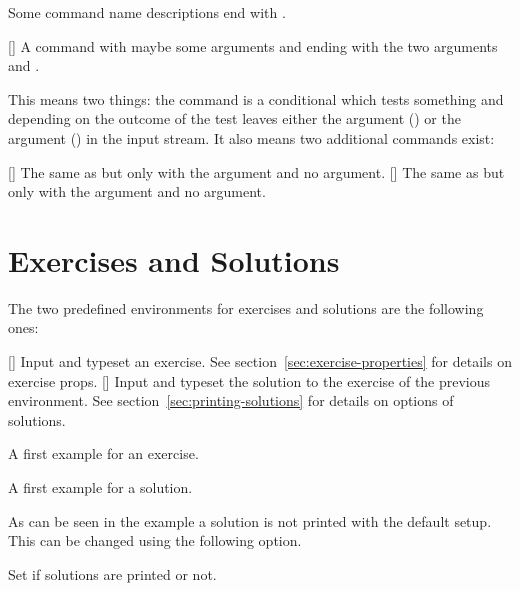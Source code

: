 \documentclass{xsim-manual}
\begin{document}
Some command name descriptions end with \code{\TF}.
\begin{commands}
  []
    A command with maybe some arguments and ending with the two arguments
     and .
\end{commands}
This means two things: the command is a conditional which tests something and
depending on the outcome of the test leaves either the  argument
() or the  argument () in the input stream.  It
also means two additional commands exist:
\begin{commands}
  []
    The same as  but only with the  argument and
    no  argument.
  []
    The same as  but only with the  argument and
    no  argument.
\end{commands}

\section{Exercises and Solutions}

The two predefined environments for exercises and solutions are the following
ones:
\begin{environments}
  []
    Input and typeset an exercise.  See section~\vref{sec:exercise-properties}
    for details on exercise \acsp*{prop}.
  []
    Input and typeset the solution to the exercise of the previous
     environment.  See section~\vref{sec:printing-solutions} for
    details on options of solutions.
\end{environments}

\begin{example}
  \begin{exercise}
    A first example for an exercise.
  \end{exercise}
  \begin{solution}
    A first example for a solution.
  \end{solution}
\end{example}

As can be seen in the example a solution is not printed with the default
setup.  This can be changed using the following option.
\begin{options}
    Set if solutions are printed or not.
\end{options}
\end{document}
